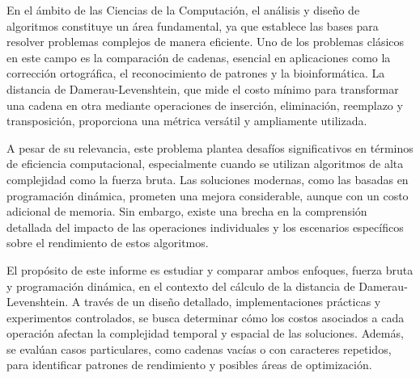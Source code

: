 En el ámbito de las Ciencias de la Computación, el análisis y diseño de algoritmos constituye un área fundamental, ya que establece las bases para resolver problemas complejos de manera eficiente. Uno de los problemas clásicos en este campo es la comparación de cadenas, esencial en aplicaciones como la corrección ortográfica, el reconocimiento de patrones y la bioinformática. La distancia de Damerau-Levenshtein, que mide el costo mínimo para transformar una cadena en otra mediante operaciones de inserción, eliminación, reemplazo y transposición, proporciona una métrica versátil y ampliamente utilizada.

A pesar de su relevancia, este problema plantea desafíos significativos en términos de eficiencia computacional, especialmente cuando se utilizan algoritmos de alta complejidad como la fuerza bruta. Las soluciones modernas, como las basadas en programación dinámica, prometen una mejora considerable, aunque con un costo adicional de memoria. Sin embargo, existe una brecha en la comprensión detallada del impacto de las operaciones individuales y los escenarios específicos sobre el rendimiento de estos algoritmos.

El propósito de este informe es estudiar y comparar ambos enfoques, fuerza bruta y programación dinámica, en el contexto del cálculo de la distancia de Damerau-Levenshtein. A través de un diseño detallado, implementaciones prácticas y experimentos controlados, se busca determinar cómo los costos asociados a cada operación afectan la complejidad temporal y espacial de las soluciones. Además, se evalúan casos particulares, como cadenas vacías o con caracteres repetidos, para identificar patrones de rendimiento y posibles áreas de optimización.


